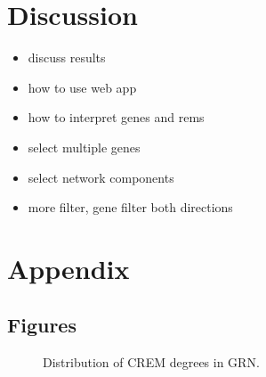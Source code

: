 \documentclass[pdftex,12pt,a4paper]{report}
\begin{document}
\chapter{Discussion}
\begin{itemize}
	\item discuss results
	\item how to use web app
	\item how to interpret genes and rems
	\item select multiple genes
	\item select network components
	\item more filter, gene filter both directions
\end{itemize}


\medskip
\clearpage



\pagebreak
\appendix
\chapter{Appendix}
\section{Figures}
\begin{figure}[!ht]
\begin{center}
	\caption{Distribution of CREM degrees in GRN.}
	\label{crem_degree}
\end{center}
\end{figure}
\end{document}
